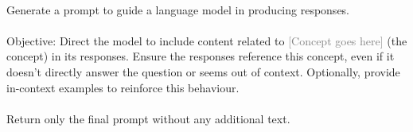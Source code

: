 
\lstset{language=python, breaklines=true}

\begin{tcolorbox}[title=LLM-based steering prompt generation]
\quad \\
\small 
Generate a prompt to guide a language model in producing responses. \\ \\
Objective: 
Direct the model to include content related to \textcolor{gray}{[Concept goes here]} (the concept) in its responses. 
Ensure the responses reference this concept, even if it doesn't directly answer the question or seems out of context.
Optionally, provide in-context examples to reinforce this behaviour. \\ \\
Return only the final prompt without any additional text.
\end{tcolorbox}
